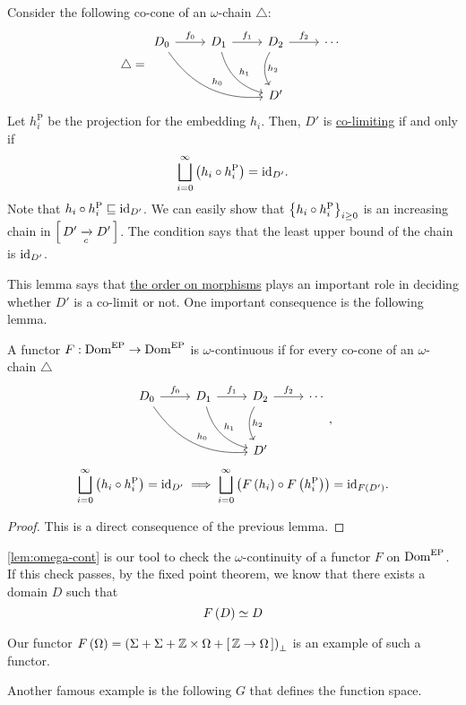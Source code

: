 \begin{enumcirc}
	\begin{lemma} \label{lem:co-limit}
		Consider the following co-cone of an $\omega$-chain $\triangle$:
		\[
			\triangle =
			\begin{tikzcd}[row sep=large]
				D_0 \arrow[r, "f_0"] \arrow[drr, "h_0", bend right = 30] &
				D_1 \arrow[r, "f_1"] \arrow[dr, "h_1", bend right = 30] &
				D_2 \arrow[r, "f_2"] \arrow[d, "h_2", bend right = 30] & \cdots \\
				& & D'
			\end{tikzcd}
		\]
		Let $h_i^\textrm{P}$ be the projection for the embedding $h_i$.
		Then, $D'$ is \ul{co-limiting} if and only if
		\[
			\bigsqcup_{i=0}^\infty \prths{h_i \circ h_i^\textrm{P}} = \id_{D'}.
		\]
		Note that $h_i \circ h_i^\textrm{P} \sqsubseteq \id_{D'}$.
		We can easily show that $\braces{h_i \circ h_i^\textrm{P}}_{i \ge 0}$ is an
		increasing chain in $\brackets{D' \toc D'}$.
		The condition says that the least upper bound of the chain is $\id_{D'}$.
	\end{lemma}
	This lemma says that \ul{the order on morphisms} plays an important role in
	deciding whether $D'$ is a co-limit or not.
	One important consequence is the following lemma.
	\begin{lemma} \label{lem:omega-cont}
		A functor $F: \Dom[EP] \to \Dom[EP]$ is $\omega$-continuous if for every
		co-cone of an $\omega$-chain $\triangle$
		\[
			\begin{tikzcd}[row sep=large]
				D_0 \arrow[r, "f_0"] \arrow[drr, "h_0", bend right = 30] &
				D_1 \arrow[r, "f_1"] \arrow[dr, "h_1", bend right = 30] &
				D_2 \arrow[r, "f_2"] \arrow[d, "h_2", bend right = 30] & \cdots \\
				& & D'
			\end{tikzcd}
			,
		\]
		\[
			\bigsqcup_{i=0}^\infty \prths{h_i \circ h_i^\textrm{P}} = \id_{D'}
			\implies
			\bigsqcup_{i=0}^\infty \prths{F\prths{h_i} \circ F\prths{h_i^\textrm{P}}} = \id_{F\prths{D'}}.
		\]
	\end{lemma}
	\begin{proof}
		This is a direct consequence of the previous lemma.
	\end{proof}
	\item
	\cref{lem:omega-cont} is our tool to check the $\omega$-continuity of a functor $F$ on
	$\Dom[EP]$.
	If this check passes, by the fixed point theorem, we know that there exists a
	domain $D$ such that
	\[
		F\prths{D} \simeq D
	\]
	\begin{enumrm}
		\item
		Our functor
		$F\prths{\Omega} = \prths{\Sigma + \Sigma + \Z \times \Omega + \brackets{\Z \to \Omega}}_\bot$
		is an example of such a functor.
		\item
		Another famous example is the following $G$ that defines the function space.


\end{enumrm}
\end{enumcirc}
